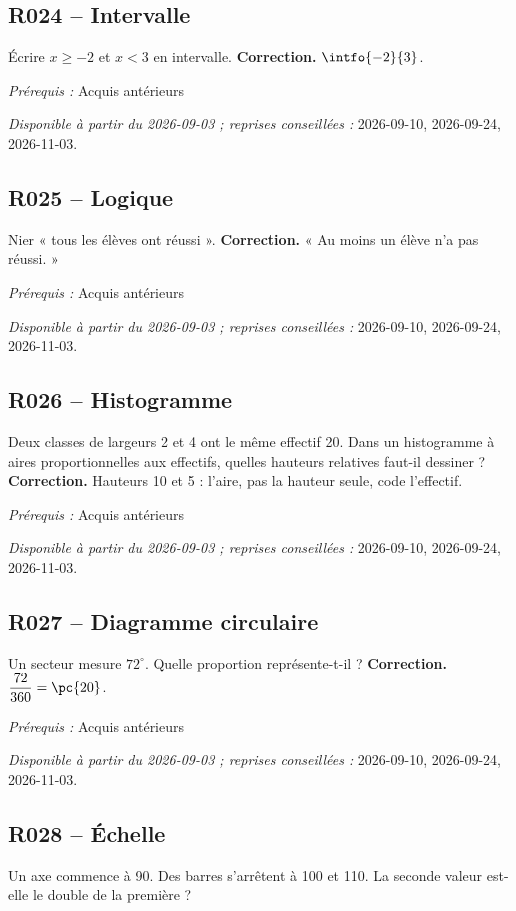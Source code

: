 \subsection*{R024 -- Intervalle}\label{R024}
Écrire $x\geq-2$ et $x<3$ en intervalle.
\ifmxteacher\textbf{Correction.} $\intfo{-2}{3}$.\par\textit{Prérequis :} Acquis antérieurs\par\textit{Disponible à partir du 2026-09-03 ; reprises conseillées :} 2026-09-10, 2026-09-24, 2026-11-03.\fi
{}\subsection*{R025 -- Logique}\label{R025}
Nier « tous les élèves ont réussi ».
\ifmxteacher\textbf{Correction.} « Au moins un élève n’a pas réussi. »\par\textit{Prérequis :} Acquis antérieurs\par\textit{Disponible à partir du 2026-09-03 ; reprises conseillées :} 2026-09-10, 2026-09-24, 2026-11-03.\fi
{}\subsection*{R026 -- Histogramme}\label{R026}
Deux classes de largeurs 2 et 4 ont le même effectif 20. Dans un histogramme à aires proportionnelles aux effectifs, quelles hauteurs relatives faut-il dessiner ?
\ifmxteacher\textbf{Correction.} Hauteurs 10 et 5 : l’aire, pas la hauteur seule, code l’effectif.\par\textit{Prérequis :} Acquis antérieurs\par\textit{Disponible à partir du 2026-09-03 ; reprises conseillées :} 2026-09-10, 2026-09-24, 2026-11-03.\fi
{}\subsection*{R027 -- Diagramme circulaire}\label{R027}
Un secteur mesure $72^\circ$. Quelle proportion représente-t-il ?
\ifmxteacher\textbf{Correction.} $\dfrac{72}{360}=\pc{20}$.\par\textit{Prérequis :} Acquis antérieurs\par\textit{Disponible à partir du 2026-09-03 ; reprises conseillées :} 2026-09-10, 2026-09-24, 2026-11-03.\fi
{}\subsection*{R028 -- Échelle}\label{R028}
Un axe commence à 90. Des barres s’arrêtent à 100 et 110. La seconde valeur est-elle le double de la première ?

